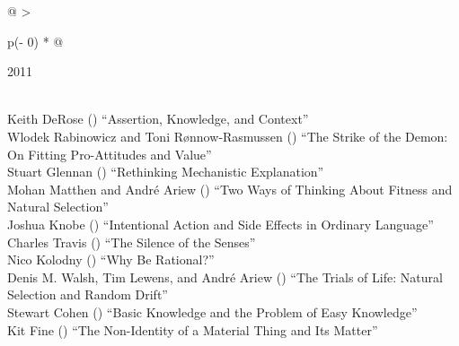 \documentclass[
  10pt,
  letterpaper,
  DIV=11,
  numbers=noendperiod,
  twoside]{scrartcl}
\begin{document}
\begin{longtable}[]{@{}
  >{\raggedright\arraybackslash}p{(\columnwidth - 0\tabcolsep) * }@{}}

\caption{\label{tbl-top-ten-2002}Most cited articles published less than
ten years ago as of 2011.}

\tabularnewline

\toprule\noalign{}
\begin{minipage}[b]{\linewidth}\raggedright
2011
\end{minipage} \\
\midrule\noalign{}
\endhead
\bottomrule\noalign{}
\endlastfoot
Keith DeRose
()
``Assertion, Knowledge, and Context'' \\
Wlodek Rabinowicz and Toni Rønnow‐Rasmussen
()
``The Strike of the Demon: On Fitting Pro-Attitudes and Value'' \\
Stuart Glennan
()
``Rethinking Mechanistic Explanation'' \\
Mohan Matthen and André Ariew
()
``Two Ways of Thinking About Fitness and Natural Selection'' \\
Joshua Knobe
()
``Intentional Action and Side Effects in Ordinary Language'' \\
Charles Travis
()
``The Silence of the Senses'' \\
Nico Kolodny
()
``Why Be Rational?'' \\
Denis M. Walsh, Tim Lewens, and André Ariew
()
``The Trials of Life: Natural Selection and Random Drift'' \\
Stewart Cohen
()
``Basic Knowledge and the Problem of Easy Knowledge'' \\
Kit Fine
()
``The Non-Identity of a Material Thing and Its Matter'' \\

\end{longtable}
\end{document}
